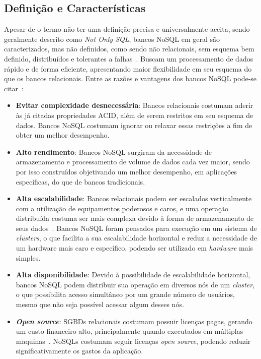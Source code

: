 \subsection{Definição e Características}
Apesar de o termo não ter uma definição precisa e universalmente aceita, sendo geralmente descrito como \emph{Not Only SQL}, bancos NoSQL em geral são caracterizados, mas não definidos, como sendo não relacionais, sem esquema bem definido, distribuídos e tolerantes a falhas~\cite{pramod}. Buscam um processamento de dados rápido e de forma eficiente, apresentando maior flexibilidade em seu esquema do que os bancos relacionais.
Entre as razões e vantagens dos bancos NoSQL pode-se citar~\cite{chrisnosql}:
\begin{itemize}
	\item \textbf{Evitar complexidade desnecessária}: Bancos relacionais costumam aderir às já citadas propriedades ACID, além de serem restritos em seu esquema de dados. Bancos NoSQL costumam ignorar ou relaxar essas restrições a fim de obter um melhor desempenho.
	
	\item \textbf{Alto rendimento}: Bancos NoSQL surgiram da necessidade de armazenamento e processamento de volume de dados cada vez maior, sendo por isso construídos objetivando um melhor desempenho, em aplicações específicas, do que de bancos tradicionais.
	
	\item \textbf{Alta escalabilidade}: Bancos relacionais podem ser escalados verticalmente com a utilização de equipamentos poderosos e caros, e uma operação distribuída costuma ser mais complexa devido à forma de armazenamento de seus dados~\cite{leavitt2010nosql}. Bancos NoSQL foram pensados para execução em um sistema de \emph{clusters}, o que facilita a sua escalabilidade horizontal e reduz a necessidade de um hardware mais caro e específico, podendo ser utilizado em \emph{hardware} mais simples. 
	
	\item \textbf{Alta disponibilidade}: Devido à possibilidade de escalabilidade horizontal, bancos NoSQL podem distribuir sua operação em diversos nós de um \emph{cluster}, o que possibilita acesso simultâneo por um grande número de usuários, mesmo que não seja possível acessar algum desses nós. 
	
	\item \textbf{\emph{Open source}}: SGBDs relacionais costumam possuir licenças pagas, gerando um custo financeiro alto, principalmente quando executados em múltiplas maquinas~\cite{pramod}. NoSQLs costumam seguir licenças \emph{open source}, podendo reduzir significativamente os gastos da aplicação. 
\end{itemize}

